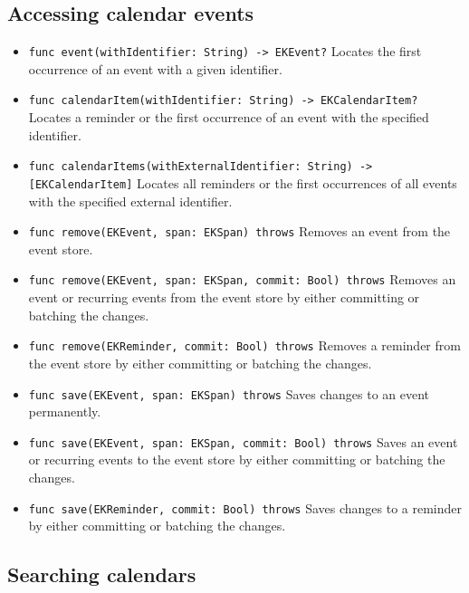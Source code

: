 \documentclass{article}
\begin{document}
\subsection*{Accessing calendar events}

\begin{itemize}
    \item \texttt{func event(withIdentifier: String) -> EKEvent?}
    Locates the first occurrence of an event with a given identifier.

    \item \texttt{func calendarItem(withIdentifier: String) -> EKCalendarItem?}
    Locates a reminder or the first occurrence of an event with the specified identifier.

    \item \texttt{func calendarItems(withExternalIdentifier: String) -> [EKCalendarItem]}
    Locates all reminders or the first occurrences of all events with the specified external identifier.

    \item \texttt{func remove(EKEvent, span: EKSpan) throws}
    Removes an event from the event store.

    \item \texttt{func remove(EKEvent, span: EKSpan, commit: Bool) throws}
    Removes an event or recurring events from the event store by either committing or batching the changes.

    \item \texttt{func remove(EKReminder, commit: Bool) throws}
    Removes a reminder from the event store by either committing or batching the changes.

    \item \texttt{func save(EKEvent, span: EKSpan) throws}
    Saves changes to an event permanently.

    \item \texttt{func save(EKEvent, span: EKSpan, commit: Bool) throws}
    Saves an event or recurring events to the event store by either committing or batching the changes.

    \item \texttt{func save(EKReminder, commit: Bool) throws}
    Saves changes to a reminder by either committing or batching the changes.
\end{itemize}

\subsection*{Searching calendars}
\end{document}
